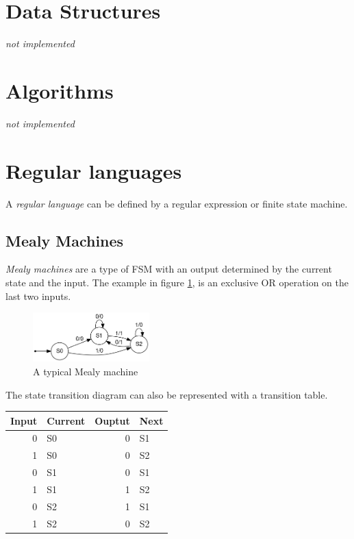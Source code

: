 \documentclass[11pt]{article}
\author{Alexander Neville}
\date{\today}
\title{}
\begin{document}
\tableofcontents


\section{Data Structures}
\label{sec:orge14ce2b}

\emph{not implemented}

\section{Algorithms}
\label{sec:orgd53f464}

\emph{not implemented}

\section{Regular languages}
\label{sec:org8eaf998}

A \emph{regular language} can be defined by a regular expression or finite state machine.

\subsection{Mealy Machines}
\label{sec:orgf9cf509}

\emph{Mealy machines} are a type of FSM with an output determined by the current state and the input. The example in figure \ref{img:mealy}, is an exclusive OR operation on the last two inputs.

\begin{figure}[H]
\centering
\includegraphics[width=0.4\textwidth, keepaspectratio, frame]{./images/mealy.png}
\caption{A typical Mealy machine}
\label{img:mealy}
\end{figure}

The state transition diagram can also be represented with a transition table.

\begin{center}
\begin{tabular}{rlrl}
\hline
Input & Current & Ouptut & Next\\
\hline
0 & S0 & 0 & S1\\
1 & S0 & 0 & S2\\
0 & S1 & 0 & S1\\
1 & S1 & 1 & S2\\
0 & S2 & 1 & S1\\
1 & S2 & 0 & S2\\
\hline
\end{tabular}
\end{center}
\end{document}
